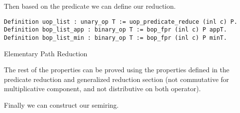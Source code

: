 Then based on the predicate we can define our reduction.
\begin{listing}[H]
\begin{verbatim}
Definition uop_list : unary_op T := uop_predicate_reduce (inl c) P.
Definition bop_list_app : binary_op T := bop_fpr (inl c) P appT.
Definition bop_list_min : binary_op T := bop_fpr (inl c) P minT.
\end{verbatim}
\caption{Elementary Path Reduction} 
\label{coq:def:elementary_path_reduction}
\end{listing}

The rest of the properties can be proved using the properties defined in the predicate reduction and generalized reduction section (not commutative for multiplicative component, and not distributive on both operator).

Finally we can construct our semiring.

